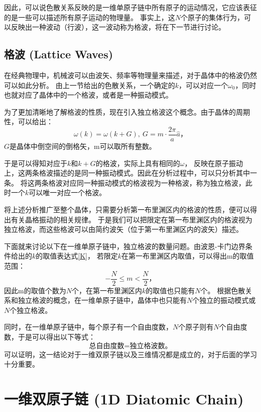 \documentclass[declarePage]{ecnuthesis}
\begin{document}
因此，可以说色散关系反映的是一维单原子链中所有原子的运动情况，它应该表征的是一些可以描述所有原子运动的物理量。%
事实上，这$N$个原子的集体行为，可以反映出一种波动（行波），这一波动称为格波，将在下一节进行讨论。

\subsection{格波 (Lattice Waves)} \label{LW}

在经典物理中，机械波可以由波矢、频率等物理量来描述，对于晶体中的格波仍然可以如此分析。%
由上一节给出的色散关系，一个确定的$k$，可以对应一个$\omega_0$，同时也就对应了晶体中的一个格波，或者是一种振动模式。

为了更加清晰地了解格波的性质，现在引入独立格波这个概念。由于晶体的周期性，可以给出：
\begin{equation}
    \omega(k) = \omega(k+G),\ G=m \cdot \frac{2\pi}{a}\hat{a} \text{，}
\end{equation}
$G$是晶体中倒空间的倒格矢，m可以取所有整数。

于是可以得知对应于$k$和$k+G$的格波，实际上具有相同的$\omega$，%
反映在原子振动上，这两条格波描述的是同一种振动模式。因此在分析过程中，可以只分析其中一条。%
将这两条格波对应同一种振动模式的格波视为一种格波，称为独立格波，此时一个$k$可以唯一对应一个格波。

将上述分析推广至整个晶体，只需要分析第一布里渊区内的格波的性质，便可以得出有关晶格振动的相关规律。%
于是我们可以把限定在第一布里渊区内的格波视为独立格波，而这些格波可以由简约波矢（位于第一布里渊区内的波矢）描述。

下面就来讨论以下在一维单原子链中，独立格波的数量问题。由波恩-卡门边界条件给出的$k$的取值表达式\ref{K}，%
若限定$k$在第一布里渊区内取值，可以得出m的取值范围：
\begin{equation}
    -\frac{N}{2} \le m < \frac{N}{2} \text{，}
\end{equation}
因此m的取值个数为$N$个，在第一布里渊区内$k$的取值也只能有$N$个。
根据色散关系和独立格波的概念，在一维单原子链中，晶体中也只能有$N$个独立的振动模式或$N$个独立格波。

同时，在一维单原子链中，每个原子有一个自由度数，$N$个原子则有$N$个自由度数，于是可以得出以下等式：
\begin{equation}
    \text{总自由度数}=\text{独立格波数} \text{。} \label{3PN}
\end{equation}
可以证明，这一结论对于一维双原子链以及三维情况都是成立的，对于后面的学习十分重要。

\section{一维双原子链 (1D Diatomic Chain)}
\end{document}
